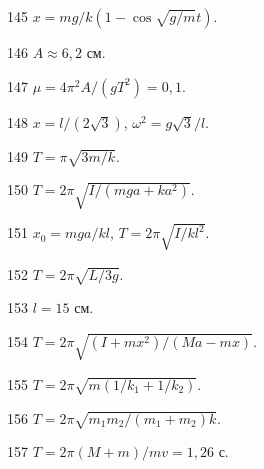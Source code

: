\begin{Answer}{145}
$x = mg/k(1-\cos \sqrt{g/m} t)$.
\end{Answer}
\begin{Answer}{146}
$A \approx 6,2$ см.
\end{Answer}
\begin{Answer}{147}
$\mu = 4 \pi^2 A / (gT^2) = 0,1$.
\end{Answer}
\begin{Answer}{148}
$x = l/(2\sqrt{3})$, $\omega^2 = g\sqrt{3} / l$.
\end{Answer}
\begin{Answer}{149}
$T =  \pi\sqrt{3m/k}$.
\end{Answer}
\begin{Answer}{150}
$T = 2 \pi \sqrt{I/(mga + ka^2)}$.
\end{Answer}
\begin{Answer}{151}
$x_0 = mga/kl$, $T = 2 \pi \sqrt{I/kl^2}$.
\end{Answer}
\begin{Answer}{152}
$T = 2 \pi \sqrt{L/3g}$.
\end{Answer}
\begin{Answer}{153}
$l = 15$ см.
\end{Answer}
\begin{Answer}{154}
$T = 2 \pi \sqrt{(I+mx^2)/(Ma - mx)}$.
\end{Answer}
\begin{Answer}{155}
$T = 2 \pi \sqrt{m(1/k_1 + 1/k_2)}$.
\end{Answer}
\begin{Answer}{156}
$T = 2 \pi \sqrt{m_1m_2/(m_1 + m_2)k}$.
\end{Answer}
\begin{Answer}{157}
$T = 2 \pi (M+m) / mv = 1,26$ с.
\end{Answer}
